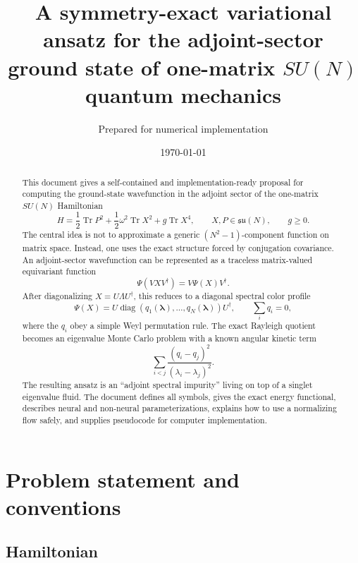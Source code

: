 \documentclass[11pt]{article}
\title{A symmetry-exact variational ansatz for the adjoint-sector ground state of one-matrix $SU(N)$ quantum mechanics}
\author{Prepared for numerical implementation}
\date{\today}
\newcommand{\Tr}{\operatorname{Tr}}
\newcommand{\diag}{\operatorname{diag}}
\newcommand{\su}{\mathfrak{su}}
\begin{document}
\maketitle

\begin{abstract}
This document gives a self-contained and implementation-ready proposal for computing the ground-state wavefunction in the adjoint sector of the one-matrix $SU(N)$ Hamiltonian
\begin{equation}
H=\frac12 \Tr P^2+\frac12\omega^2\Tr X^2+g\Tr X^4,
\qquad X,P\in \su(N),\qquad g\geq 0.
\end{equation}
The central idea is not to approximate a generic $(N^2-1)$-component function on matrix space.  Instead, one uses the exact structure forced by conjugation covariance.  An adjoint-sector wavefunction can be represented as a traceless matrix-valued equivariant function
\begin{equation}
\Psi(VXV^\dagger)=V\Psi(X)V^\dagger.
\end{equation}
After diagonalizing $X=U\Lambda U^\dagger$, this reduces to a diagonal spectral color profile
\begin{equation}
\Psi(X)=U\diag(q_1(\bm\lambda),\ldots,q_N(\bm\lambda))U^\dagger,
\qquad \sum_i q_i=0,
\end{equation}
where the $q_i$ obey a simple Weyl permutation rule.  The exact Rayleigh quotient becomes an eigenvalue Monte Carlo problem with a known angular kinetic term
\begin{equation}
\sum_{i<j}\frac{(q_i-q_j)^2}{(\lambda_i-\lambda_j)^2}.
\end{equation}
The resulting ansatz is an ``adjoint spectral impurity'' living on top of a singlet eigenvalue fluid.  The document defines all symbols, gives the exact energy functional, describes neural and non-neural parameterizations, explains how to use a normalizing flow safely, and supplies pseudocode for computer implementation.
\end{abstract}

\tableofcontents
\newpage

\section{Problem statement and conventions}

\subsection{Hamiltonian}
\end{document}
